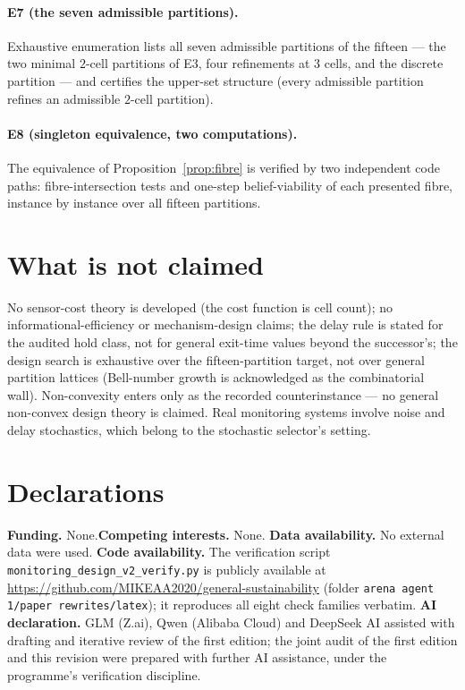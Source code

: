 \documentclass[10pt,twocolumn]{article}
\theoremstyle{definition}
\begin{document}
\paragraph{E7 (the seven admissible partitions).} Exhaustive enumeration
lists all seven admissible partitions of the fifteen --- the two minimal
$2$-cell partitions of E3, four refinements at $3$ cells, and the discrete
partition --- and certifies the upper-set structure (every admissible
partition refines an admissible $2$-cell partition).

\paragraph{E8 (singleton equivalence, two computations).} The equivalence
of Proposition~\ref{prop:fibre} is verified by two independent code paths:
fibre-intersection tests and one-step belief-viability of each presented
fibre, instance by instance over all fifteen partitions.

\section{What is not claimed}

No sensor-cost theory is developed (the cost function is cell count); no
informational-efficiency or mechanism-design claims; the delay rule is
stated for the audited hold class, not for general exit-time values
beyond the successor's; the design search is exhaustive over the
fifteen-partition target, not over general partition lattices (Bell-number
growth is acknowledged as the combinatorial wall). Non-convexity enters
only as the recorded counterinstance --- no general non-convex design
theory is claimed. Real monitoring systems involve noise and delay
stochastics, which belong to the stochastic selector's setting.


\section*{Declarations}
\textbf{Funding.} None.\quad \textbf{Competing interests.} None.\quad
\textbf{Data availability.} No external data were used.\quad
\textbf{Code availability.} The verification script
\texttt{monitoring\_design\_v2\_verify.py} is publicly available at
\url{https://github.com/MIKEAA2020/general-sustainability} (folder
\texttt{arena agent 1/paper rewrites/latex}); it reproduces all eight check
families verbatim.\quad
\textbf{AI declaration.} GLM (Z.ai), Qwen (Alibaba Cloud) and DeepSeek AI
assisted with drafting and iterative review of the first edition; the joint
audit of the first edition and this revision were prepared with further AI
assistance, under the programme's verification discipline.
\end{document}
